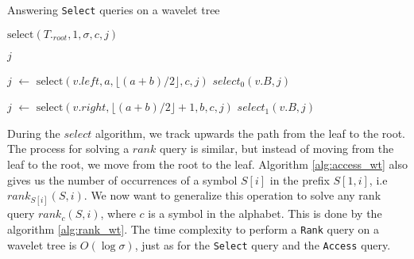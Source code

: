 \begin{algorithm}
    \caption{Answering \texttt{Select} queries on a wavelet tree}\label{alg:select_wt}
    \begin{algorithmic}

        \State \Return $\text{select}(T._{root},1, \sigma, c, j)$
        \EndFunction

        \vspace{0.4cm}

        \State \Return $j$
        \EndIf

        \State $j$ $\gets$ $\text{select}(v.left, a, \lfloor (a+b)/2 \rfloor, c, j)$
        \Return $select_0(v.B,j)$

        \Else
        \State $j$ $\gets$ $\text{select}(v.right, \lfloor (a+b)/2 \rfloor +1, b, c, j)$
        \State \Return $select_1(v.B,j)$
        \EndIf

        \EndFunction

    \end{algorithmic}
\end{algorithm}

\noindent During the $select$ algorithm, we track upwards the path from the leaf to the root. The process for solving a $rank$ query is similar, but instead of moving from the leaf to the root, we move from the root to the leaf. Algorithm \ref{alg:access_wt} also gives us the number of occurrences of a symbol $S[i]$ in the prefix $S[1,i]$, i.e $rank_{S[i]}(S,i)$. We now want to generalize this operation to solve any rank query $rank_c(S,i)$, where $c$ is a symbol in the alphabet. This is done by the algorithm \ref{alg:rank_wt}. The time complexity to perform a \texttt{Rank} query on a wavelet tree is $O(\log \sigma)$, just as for the \texttt{Select} query and the \texttt{Access} query.



